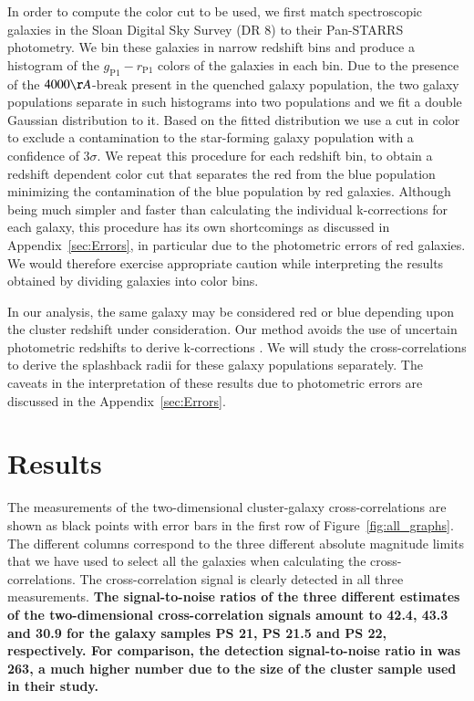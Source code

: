 \documentclass[iop, apjl, twocolappendix, numberedappendix]{emulateapj}
\begin{document}
In order to compute the color cut to be used, we first match spectroscopic
galaxies in the Sloan Digital Sky Survey (DR 8) to their
Pan-STARRS photometry. We bin these galaxies in narrow redshift bins and
produce a histogram of the $g_{\mathrm{P1}}-r_{\mathrm{P1}}$ colors of the
galaxies in each bin. Due to the presence of the $4000\AA$-break present in the
quenched galaxy population, the two galaxy populations separate in such histograms
into two populations and we fit a double Gaussian distribution to it.
Based on the fitted distribution we use a cut in color to exclude a
contamination to the star-forming galaxy population with a confidence
of 3$\sigma$. We repeat this procedure for each redshift bin, to obtain a redshift
dependent color cut that separates the red from the blue population minimizing
the contamination of the blue population by red galaxies. Although being much
simpler and faster than calculating the individual k-corrections for each
galaxy, this procedure has its own shortcomings as discussed in
Appendix~\ref{sec:Errors}, in particular due to the photometric errors of red
galaxies. We would therefore exercise appropriate caution while interpreting
the results obtained by dividing galaxies into color bins.

In our analysis, the same galaxy may be considered red or blue depending upon
the cluster redshift under consideration. Our method avoids the use of
uncertain photometric redshifts to derive k-corrections
\citep[cf.][]{baxter2017halo}. We will study the cross-correlations to derive
the splashback radii for these galaxy populations separately. The caveats in
the interpretation of these results due to photometric errors are discussed in the
Appendix~\ref{sec:Errors}.

\section{Results}
\label{sec:Results}
The measurements of the two-dimensional cluster-galaxy
cross-correlations are shown as black points with error bars in the
first row of Figure~\ref{fig:all_graphs}. The different columns
correspond to the three different absolute magnitude limits that we
have used to select all the galaxies when calculating the
cross-correlations. The cross-correlation signal is clearly detected
in all three measurements. \textbf{The signal-to-noise ratios of the
three different estimates of the two-dimensional cross-correlation signals
amount to 42.4, 43.3 and 30.9 for the galaxy samples PS 21, PS 21.5 and PS 22,
respectively. For comparison, the detection signal-to-noise ratio in
\citet{more2016detection} was 263, a much higher number due to the size of the
cluster sample used in their study.}
\end{document}
